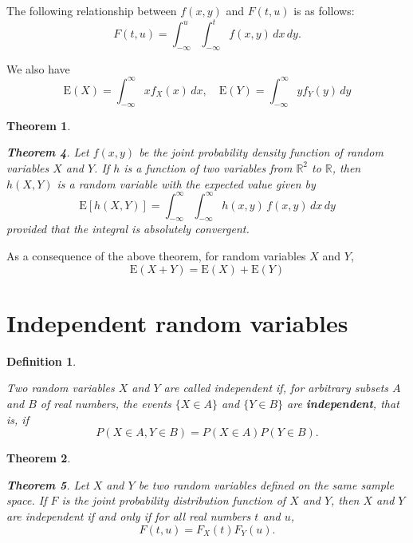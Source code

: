 \documentclass[
]{book}
\newtheorem{theorem}{Theorem}[chapter]
\theoremstyle{definition}
\newtheorem{definition}{Definition}[chapter]
\theoremstyle{definition}
\theoremstyle{definition}
\theoremstyle{definition}
\theoremstyle{remark}
\begin{document}
The following relationship between \(f(x,y)\) and \(F(t,u)\) is as follows:
\[F(t,u) = \int_{-\infty}^{u}\int_{-\infty}^{t} f(x,y)\, dx\, dy.\]

We also have
\[\mathrm{E}(X) =   \int_{-\infty}^\infty x f_X(x)\, dx , \quad \mathrm{E}(Y) =   \int_{-\infty}^\infty y f_Y(y)\, dy\]

\begin{theorem}
\protect\hypertarget{thm:unlabeled-div-19}{}\label{thm:unlabeled-div-19}

\textbf{Theorem 4}. \emph{Let \(f (x, y)\) be the joint probability density function
of random variables \(X\) and \(Y\). If \(h\) is a function of two variables
from \(\mathbb{R}^2\) to \(\mathbb{R}\), then \(h(X, Y )\) is a random
variable with the expected value given by
\[\mathrm{E}[h(X,Y)] = \int_{-\infty}^{\infty}\int_{-\infty}^{\infty} h(x,y) \, f(x,y)\, dx\, dy\]
provided that the integral is absolutely convergent.}

\end{theorem}

As a consequence of the above theorem, for random variables \(X\) and \(Y\),
\[\mathrm{E}(X + Y) = \mathrm{E}(X) + \mathrm{E}(Y)\]

\hypertarget{independent-random-variables}{%
\section{Independent random variables}\label{independent-random-variables}}

\begin{definition}
\protect\hypertarget{def:unlabeled-div-20}{}\label{def:unlabeled-div-20}

\emph{Two random variables \(X\) and \(Y\) are called
independent if, for arbitrary subsets \(A\) and \(B\) of real numbers, the
events \(\{X \in A\}\) and \(\{Y \in B\}\) are \textbf{independent}, that is, if
\[P(X \in A, Y \in B) = P(X \in A) P(Y \in B).\]}

\end{definition}

\begin{theorem}
\protect\hypertarget{thm:unlabeled-div-21}{}\label{thm:unlabeled-div-21}

\textbf{Theorem 5}. \emph{Let \(X\) and \(Y\) be two random variables defined on the
same sample space. If \(F\) is the joint probability distribution function
of \(X\) and \(Y\), then \(X\) and \(Y\) are independent if and only if for all
real numbers \(t\) and \(u\), \[F(t,u)  = F_X(t) F_Y(u).\]}

\end{theorem}
\end{document}
